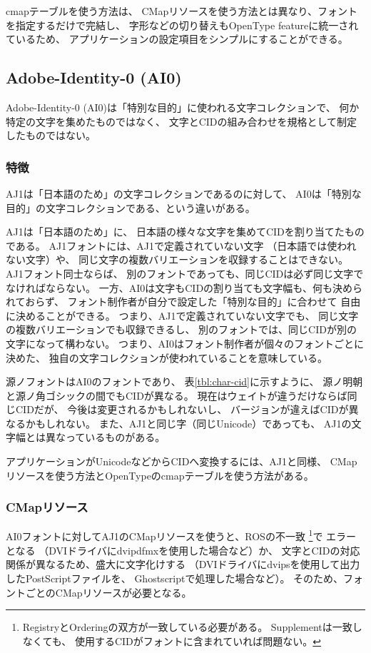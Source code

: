 cmapテーブルを使う方法は、
CMapリソースを使う方法とは異なり、フォントを指定するだけで完結し、
字形などの切り替えもOpenType featureに統一されているため、
アプリケーションの設定項目をシンプルにすることができる。

\subsection{Adobe-Identity-0 (AI0)}

Adobe-Identity-0 (AI0)は「特別な目的」に使われる文字コレクションで、
何か特定の文字を集めたものではなく、
文字とCIDの組み合わせを規格として制定したものではない。

\subsubsection{特徴}

AJ1は「日本語のため」の文字コレクションであるのに対して、
AI0は「特別な目的」の文字コレクションである、という違いがある。

AJ1は「日本語のため」に、
日本語の様々な文字を集めてCIDを割り当てたものである。
AJ1フォントには、AJ1で定義されていない文字
（日本語では使われない文字）や、
同じ文字の複数バリエーションを収録することはできない。
AJ1フォント同士ならば、
別のフォントであっても、同じCIDは必ず同じ文字でなければならない。
一方、AI0は文字もCIDの割り当ても文字幅も、何も決められておらず、
フォント制作者が自分で設定した「特別な目的」に合わせて
自由に決めることができる。
つまり、AJ1で定義されていない文字でも、
同じ文字の複数バリエーションでも収録できるし、
別のフォントでは、同じCIDが別の文字になって構わない。
つまり、AI0はフォント制作者が個々のフォントごとに決めた、
独自の文字コレクションが使われていることを意味している。

源ノフォントはAI0のフォントであり、
表\ref{tbl:char-cid}に示すように、
源ノ明朝と源ノ角ゴシックの間でもCIDが異なる。
現在はウェイトが違うだけならば同じCIDだが、
今後は変更されるかもしれないし、
バージョンが違えばCIDが異なるかもしれない。
また、AJ1と同じ字（同じUnicode）であっても、
AJ1の文字幅とは異なっているものがある。

アプリケーションがUnicodeなどからCIDへ変換するには、AJ1と同様、
CMapリソースを使う方法とOpenTypeのcmapテーブルを使う方法がある。

\subsubsection{CMapリソース}

AI0フォントに対してAJ1のCMapリソースを使うと、ROSの不一致
\footnote{RegistryとOrderingの双方が一致している必要がある。
  Supplementは一致しなくても、
  使用するCIDがフォントに含まれていれば問題ない。}で
エラーとなる
（DVIドライバにdvipdfmxを使用した場合など）か、
文字とCIDの対応関係が異なるため、盛大に文字化けする
（DVIドライバにdvipsを使用して出力したPostScriptファイルを、
  Ghostscriptで処理した場合など）。
そのため、フォントごとのCMapリソースが必要となる。

